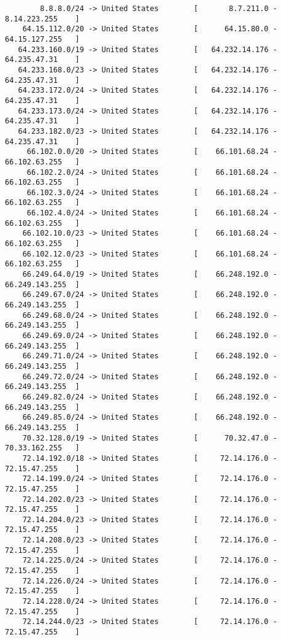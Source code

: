 \documentclass[10pt,a4paper,twoside,onecolumn]{article}
\begin{document}
\lstset{caption=,label=lst:ip-addresses,language=,numbers=none}
\begin{lstlisting}
        8.8.8.0/24 -> United States        [       8.7.211.0 - 8.14.223.255    ]
    64.15.112.0/20 -> United States        [      64.15.80.0 - 64.15.127.255   ]
   64.233.160.0/19 -> United States        [   64.232.14.176 - 64.235.47.31    ]
   64.233.168.0/23 -> United States        [   64.232.14.176 - 64.235.47.31    ]
   64.233.172.0/24 -> United States        [   64.232.14.176 - 64.235.47.31    ]
   64.233.173.0/24 -> United States        [   64.232.14.176 - 64.235.47.31    ]
   64.233.182.0/23 -> United States        [   64.232.14.176 - 64.235.47.31    ]
     66.102.0.0/20 -> United States        [    66.101.68.24 - 66.102.63.255   ]
     66.102.2.0/24 -> United States        [    66.101.68.24 - 66.102.63.255   ]
     66.102.3.0/24 -> United States        [    66.101.68.24 - 66.102.63.255   ]
     66.102.4.0/24 -> United States        [    66.101.68.24 - 66.102.63.255   ]
    66.102.10.0/23 -> United States        [    66.101.68.24 - 66.102.63.255   ]
    66.102.12.0/23 -> United States        [    66.101.68.24 - 66.102.63.255   ]
    66.249.64.0/19 -> United States        [    66.248.192.0 - 66.249.143.255  ]
    66.249.67.0/24 -> United States        [    66.248.192.0 - 66.249.143.255  ]
    66.249.68.0/24 -> United States        [    66.248.192.0 - 66.249.143.255  ]
    66.249.69.0/24 -> United States        [    66.248.192.0 - 66.249.143.255  ]
    66.249.71.0/24 -> United States        [    66.248.192.0 - 66.249.143.255  ]
    66.249.72.0/24 -> United States        [    66.248.192.0 - 66.249.143.255  ]
    66.249.82.0/24 -> United States        [    66.248.192.0 - 66.249.143.255  ]
    66.249.85.0/24 -> United States        [    66.248.192.0 - 66.249.143.255  ]
    70.32.128.0/19 -> United States        [      70.32.47.0 - 70.33.162.255   ]
    72.14.192.0/18 -> United States        [     72.14.176.0 - 72.15.47.255    ]
    72.14.199.0/24 -> United States        [     72.14.176.0 - 72.15.47.255    ]
    72.14.202.0/23 -> United States        [     72.14.176.0 - 72.15.47.255    ]
    72.14.204.0/23 -> United States        [     72.14.176.0 - 72.15.47.255    ]
    72.14.208.0/23 -> United States        [     72.14.176.0 - 72.15.47.255    ]
    72.14.225.0/24 -> United States        [     72.14.176.0 - 72.15.47.255    ]
    72.14.226.0/24 -> United States        [     72.14.176.0 - 72.15.47.255    ]
    72.14.228.0/24 -> United States        [     72.14.176.0 - 72.15.47.255    ]
    72.14.244.0/23 -> United States        [     72.14.176.0 - 72.15.47.255    ]

\end{lstlisting}
\end{document}
